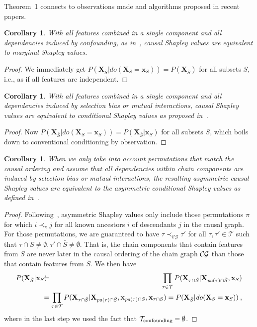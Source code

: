 \documentclass{article}
\newcommand{\vX}{\mathbf{X}}
\newcommand{\vx}{\mathbf{x}}
\newcommand{\dodo}{\mathit{do}}
\newcommand{\lvdo}[1]{\dodo(\vX_{#1} = \vx_{#1})}
\newcommand{\spa}{\mathop{\textit{\scriptsize pa}}}
\newcommand{\perm}{\pi}
\newcommand{\onder}[2]{{#1}_{\mbox{\scriptsize #2}}}
\newcommand{\isequal}{\hspace*{-2.5mm} & = & \hspace*{-2.5mm}}
\newcommand{\chaincomponents}{{\cal T}}
\newtheorem{corollary}[theorem]{Corollary}
\begin{document}
Theorem~1 connects to observations made and algorithms proposed in recent papers.
\begin{corollary}
	With all features combined in a single component and all dependencies induced by confounding, as in~\cite{janzing2019feature}, causal Shapley values are equivalent to marginal Shapley values. 
\end{corollary}
\begin{proof}
	We immediately get $P(\vX_{\bar{S}}|\lvdo{S}) = P(\vX_{\bar{S}})$ for all subsets $S$, i.e., as if all features are independent.
\end{proof}
\begin{corollary}
	With all features combined in a single component and all dependencies induced by selection bias or mutual interactions, causal Shapley values are equivalent to conditional Shapley values as proposed in~\cite{aas2019explaining}.
\end{corollary}
\begin{proof}
	Now $P(\vX_{\bar{S}}|\lvdo{S}) = P(\vX_{\bar{S}}|\vx_{S})$ for all subsets $S$, which boils down to conventional conditioning by observation.
\end{proof}
\begin{corollary}
	When we only take into account permutations that match the causal ordering and assume that all dependencies within chain components are induced by selection bias or mutual interactions, the resulting asymmetric causal Shapley values are equivalent to the asymmetric conditional Shapley values as defined in~\cite{frye2019asymmetric}.
\end{corollary}
\begin{proof}
	Following~\cite{frye2019asymmetric}, asymmetric Shapley values only include those permutations $\perm$ for which $i \prec_\perm j$ for all known ancestors $i$ of descendants $j$ in the causal graph. For those permutations, we are guaranteed to have
	$\tau \prec_{\mathcal{CG}} \tau'$ for all $\tau, \tau' \in \mathcal{T}$ such that $\tau \cap S \neq \emptyset, \tau' \cap \bar{S} \neq \emptyset$. That is, the chain components that contain features from $S$ are never later in the causal ordering of the chain graph ${\cal CG}$ than those that contain features from $\bar{S}$. We then have
	\begin{eqnarray*}
	P(\vX_{\bar{S}}|\vx_S) \isequal \prod_{\tau \in \chaincomponents} P(\vX_{\tau \cap \bar{S}}|\vX_{\spa(\tau)  \cap \bar{S}},\vx_{S}) \\
	\isequal \prod_{\tau \in \chaincomponents} P(\vX_{\tau \cap \bar{S}}|\vX_{\spa(\tau)  \cap \bar{S}},\vx_{\spa(\tau) \cap S},\vx_{\tau \cap S}) = P(\vX_{\bar{S}}|\lvdo{S}) \: ,
	\end{eqnarray*}
	where in the last step we used the fact that $\onder{\chaincomponents}{confounding} = \emptyset$.
\end{proof}
\end{document}
